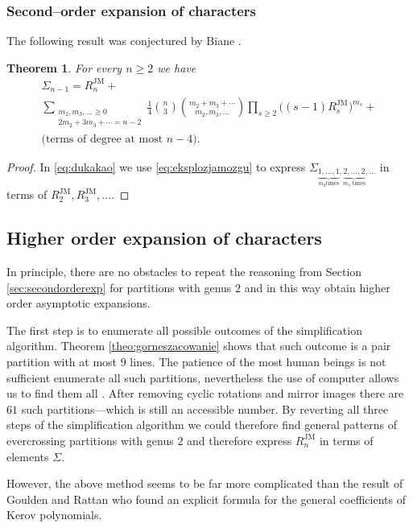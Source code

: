 \documentclass[12pt,dvips]{amsart}
\numberwithin{equation}{section} \numberwithin{figure}{section}
\theoremstyle{plain}
\newtheorem{theorem}[lemma]{Theorem}
\theoremstyle{definition}
\theoremstyle{remark}
\newcommand{\RJM}{R^{\JM}}
\DeclareMathOperator{\JM}{JM}
\begin{document}
\subsubsection{Second--order expansion of characters}
The following result was conjectured by Biane
\cite{BianeCharacters}.
\begin{theorem}
\label{theo:hahahauuau} For every $n\geq 2$ we have
\begin{multline*}
\Sigma_{n-1}= \RJM_{n}+\\ \!\!\!\!  \sum_{\substack{m_2,m_3,\dots\geq 0 \\
2m_2+3 m_3+\cdots=n-2}} \!\!\!\! \frac{1}{4} \binom{n}{3}
\binom{m_2+m_3+\cdots}{m_2,m_3,\dots} \prod_{s\geq 2} \big( (s-1)
\RJM_s \big)^{m_s} +\\ \text{(terms of degree at most $n-4$)}.
\end{multline*}
\end{theorem}
\begin{proof}
In \eqref{eq:dukakao} we use \eqref{eq:eksplozjamozgu} to express
$\Sigma_{\underbrace{1,\dots,1}_{m_2 \text{
times}},\underbrace{2,\dots,2}_{m_3 \text{ times}},\dots}$ in terms
of $\RJM_2,\RJM_3,\dots$.
\end{proof}


\subsection{Higher order expansion of characters}
In principle, there are no obstacles to repeat the reasoning from
Section \ref{sec:secondorderexp} for partitions with genus $2$ and
in this way obtain higher order asymptotic expansions.

The first step is to enumerate all possible outcomes of the
simplification algorithm. Theorem \ref{theo:gorneszacowanie} shows
that such outcome is a pair partition with at most $9$ lines. The
patience of the most human beings is not sufficient enumerate all
such partitions, nevertheless the use of computer allows us to find
them all \cite{Sniady2004table}. After removing cyclic rotations and
mirror images there are $61$ such partitions---which is still an
accessible number. By reverting all three steps of the
simplification algorithm we could therefore find general patterns of
evercrossing partitions with genus $2$ and therefore express
$\RJM_n$ in terms of elements $\Sigma$.

However, the above method seems to be far more complicated than the
result of Goulden and Rattan \cite{GouldenRattan05} who found an
explicit formula for the general coefficients of Kerov polynomials.
\end{document}
